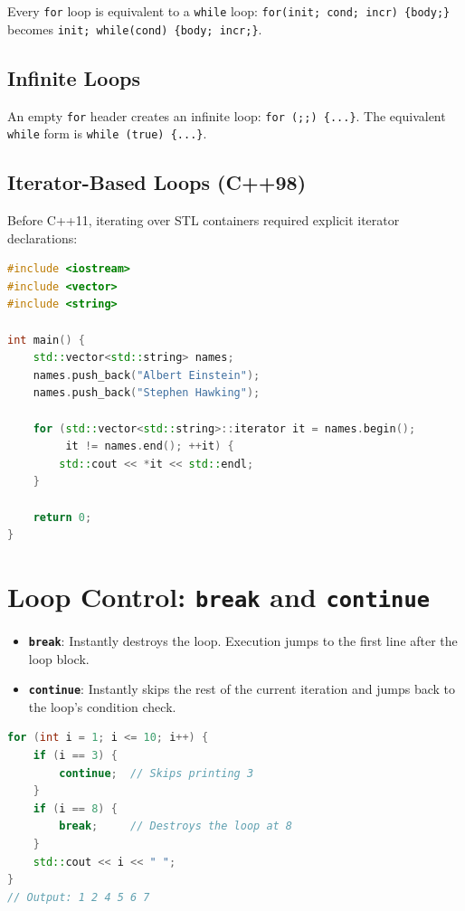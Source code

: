 Every \texttt{for} loop is equivalent to a \texttt{while} loop: \texttt{for(init; cond; incr) \{body;\}} becomes \texttt{init; while(cond) \{body; incr;\}}.

\subsection{Infinite Loops}

An empty \texttt{for} header creates an infinite loop: \texttt{for (;;) \{...\}}. The equivalent \texttt{while} form is \texttt{while (true) \{...\}}.

\subsection{Iterator-Based Loops (C++98)}

Before C++11, iterating over STL containers required explicit iterator declarations:

\begin{lstlisting}[language=C++, caption={Iterator-based loop over std::vector}]
#include <iostream>
#include <vector>
#include <string>

int main() {
    std::vector<std::string> names;
    names.push_back("Albert Einstein");
    names.push_back("Stephen Hawking");

    for (std::vector<std::string>::iterator it = names.begin();
         it != names.end(); ++it) {
        std::cout << *it << std::endl;
    }

    return 0;
}
\end{lstlisting}

\section{Loop Control: \texttt{break} and \texttt{continue}}
\label{sec:break-continue}

\begin{itemize}
    \item \textbf{\texttt{break}}: Instantly destroys the loop. Execution jumps to the first line after the loop block.
    \item \textbf{\texttt{continue}}: Instantly skips the rest of the current iteration and jumps back to the loop's condition check.
\end{itemize}

\begin{lstlisting}[language=C++, caption={break and continue}]
for (int i = 1; i <= 10; i++) {
    if (i == 3) {
        continue;  // Skips printing 3
    }
    if (i == 8) {
        break;     // Destroys the loop at 8
    }
    std::cout << i << " ";
}
// Output: 1 2 4 5 6 7
\end{lstlisting}

